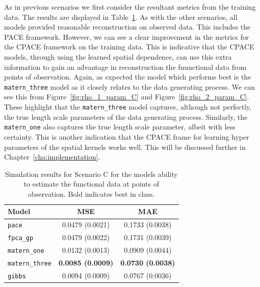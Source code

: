 As in previous scenarios we first consider the resultant metrics from the training data.
The results are displayed in Table~\ref{tab:train_C}.
As with the other scenarios, all models provided reasonable reconstruction on observed data.
This includes the PACE framework.
However, we can see a clear improvement in the metrics for the CPACE framework on the training data.
This is indicative that the CPACE models, through using the learned spatial dependence, can use this extra information to gain an advantage in reconstruction the fuunctional data from points of observation.
Again, as expected the model which performs best is the \verb*|matern_three| model as it closely relates to the data generating process. 
We can see this from Figure~\ref{fig:rho_1_param_C} and Figure~\ref{fig:rho_2_param_C}. 
These highlight that the \verb*|matern_three| model captures, although not perfectly, the true length scale parameters of the data generating process.
Similarly, the \verb*|matern_one| also captures the true length scale parameter, albeit with less certainty.
This is another indication that the CPACE frame for learning hyper parameters of the spatial kernels works well. 
This will be discussed further in Chapter~\ref{cha:implementation}.

\begin{table}
	\caption[Simulation results for Scenario C on observed data]{Simulation results for Scenario C for the models ability to estimate the functional data at points of observation. Bold indicates best in class.}
	\centering
	\label{tab:train_C}
	\begin{tabular}{lcc}
		\toprule
		\textbf{Model} & \textbf{MSE} & \textbf{MAE} \\
		\midrule
		\verb*|pace| & 0.0479 (0.0021)& 0.1733	(0.0038)\\
		\verb*|fpca_gp| & 0.0479 (0.0022) & 0.1731	(0.0039) \\
		\verb*|matern_one| & 0.0132	(0.0013) & 0.0909 (0.0044) \\
		\verb*|matern_three| & \textbf{0.0085 (0.0009)} & \textbf{ 0.0730	(0.0038)} \\
		\verb*|gibbs| & 0.0094	(0.0009) & 0.0767 (0.0036)\\
		\bottomrule
	\end{tabular}
\end{table}

